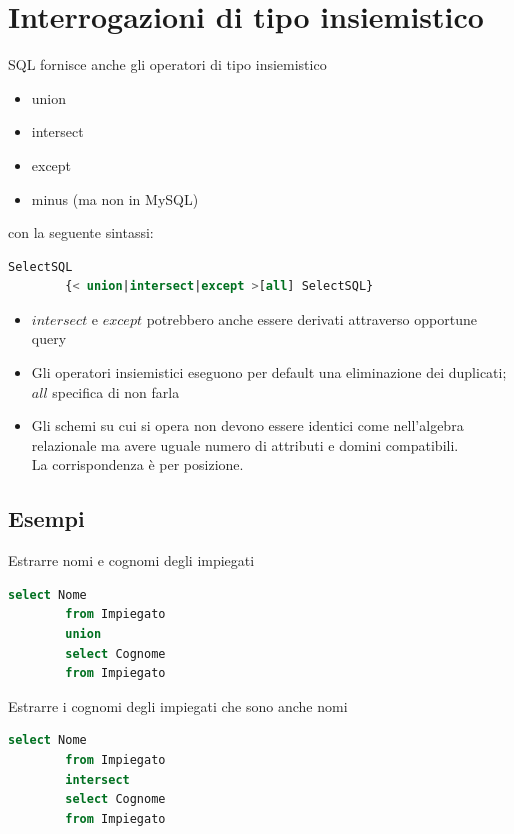 \documentclass{article}
\begin{document}
	\section{Interrogazioni di tipo insiemistico}
	SQL fornisce anche gli operatori di tipo insiemistico
	\begin{itemize}
		\item union
		\item intersect
		\item except
		\item minus (ma non in MySQL)
	\end{itemize}
	con la seguente sintassi:
	\begin{lstlisting}[language=SQL]
		SelectSQL
		{< union|intersect|except >[all] SelectSQL}
	\end{lstlisting}
	\begin{itemize}
		\item $intersect$ e $except$ potrebbero anche essere derivati attraverso opportune query
		\item Gli operatori insiemistici eseguono per default una eliminazione dei duplicati; $all$ specifica di non farla
		\item Gli schemi su cui si opera non devono essere identici come nell’algebra relazionale ma avere uguale numero di attributi e domini compatibili. \\
		La corrispondenza è per posizione.
	\end{itemize}
	\subsection{Esempi}
	Estrarre nomi e cognomi degli impiegati
	\begin{lstlisting}[language=SQL]
		select Nome
		from Impiegato
		union
		select Cognome
		from Impiegato
	\end{lstlisting}
	Estrarre i cognomi degli impiegati che sono anche nomi
	\begin{lstlisting}[language=SQL]
		select Nome
		from Impiegato
		intersect
		select Cognome
		from Impiegato
	\end{lstlisting}
\end{document}
